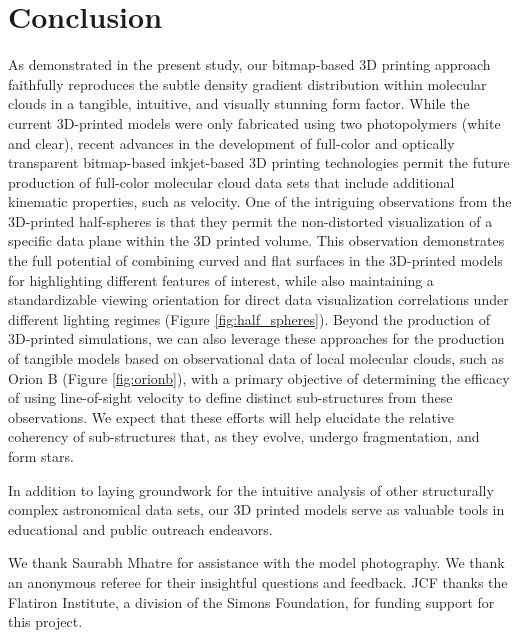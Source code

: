 \documentclass[twocolumn]{aastex63}
\begin{document}
\section{Conclusion}\label{sec:conclusion}
As demonstrated in the present study, our bitmap-based 3D printing approach faithfully reproduces the subtle density gradient distribution within molecular clouds in a tangible, intuitive, and visually stunning form factor. While the current 3D-printed models were only fabricated using two photopolymers (white and clear), recent advances in the development of full-color and optically transparent bitmap-based inkjet-based 3D printing technologies  \citep{bader_2018} permit the future production of full-color molecular cloud data sets that include additional kinematic properties, such as velocity. One of the intriguing observations from the 3D-printed half-spheres is that they permit the non-distorted visualization of a specific data plane within the 3D printed volume.  This observation demonstrates the full potential of combining curved and flat surfaces in the 3D-printed models for highlighting different features of interest, while also maintaining a standardizable viewing orientation for direct data visualization correlations under different lighting regimes (Figure \ref{fig:half_spheres}).  Beyond the production of 3D-printed simulations, we can also leverage these approaches for the production of tangible models based on observational data of local molecular clouds, such as Orion B (Figure \ref{fig:orionb}), with a primary objective of determining the efficacy of using line-of-sight velocity to define distinct sub-structures from these observations.  We expect that these efforts will help elucidate the relative coherency of sub-structures that, as they evolve, undergo fragmentation, and form stars.

In addition to laying groundwork for the intuitive analysis of other structurally complex astronomical data sets, our 3D printed models serve as valuable tools in educational and public outreach endeavors. 


\acknowledgements
We thank Saurabh Mhatre for assistance with the model photography.  We thank an anonymous referee for their insightful questions and feedback.  JCF thanks the Flatiron Institute, a division of the Simons Foundation, for funding support for this project. 






%

\end{document}
